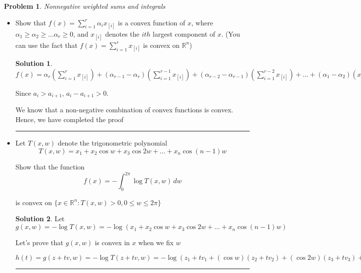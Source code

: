 \documentclass{article}
\theoremstyle{definition}
\newtheorem{problem}{Problem}
\def\fline{\rule{0.75\linewidth}{0.5pt}}
\newcommand{\finishline}{\begin{center}\fline\end{center}}
\newtheorem*{solution*}{Solution}
\newenvironment{solution}{\begin{solution*}}{{\finishline} \end{solution*}}
\begin{document}
\begin{problem}
    \textit{ Nonnegative weighted sums and integrals}
    \begin{itemize}
        \item[(a)] Show that $f(x) = \sum_{i=1}^{r} \alpha_i x_{[i]}$ is a convex function of $x$, where $\alpha_1 \geq \alpha_2 \geq \dots \alpha_r \geq 0$, and $x_{[i]}$  denotes the $ith$ largest component of $x$. (You can use the fact that $f(x) = \sum_{i=1}^{r}  x_{[i]}$ is convex on $\mathbb{R}^n$)

        \begin{solution}
            $f(x) = \alpha_r (\sum_{i=1}^{r}  x_{[i]}) + (\alpha_{r - 1} - \alpha_r) (\sum_{i=1}^{r - 1}  x_{[i]}) + (\alpha_{r - 2} - \alpha_{r - 1}) (\sum_{i=1}^{r - 2}  x_{[i]}) + \dots + (\alpha_{1} - \alpha_{2}) (x_{[1]})$ 

            Since $a_{i} > a_{i + 1}$, $a_{i} - a_{i + 1} > 0$. \newline 

            We know that a non-negative combination of convex functions is convex. Hence, we have completed the proof
        \end{solution}

        \item[(b)] Let $T(x, w)$  denote the trigonometric polynomial
        \begin{equation}
            T(x, w) = x_1 + x_2 \cos{w} + x_3 \cos{2w} + \dots + x_n \cos{(n - 1)w}
         \end{equation}

         
Show that the function 
\begin{equation}
    f(x) = - \int_{0}^{2\pi} \log T(x, w) \,dw
\end{equation}

is convex on $\{x \in \mathbb{R}^n : T(x, w) > 0, 0 \leq w \leq 2\pi\}$

\begin{solution}
    Let $g(x, w) = - \log T(x, w) = - \log(x_1 + x_2 \cos{w} + x_3 \cos{2w} + \dots + x_n \cos{(n - 1)w})$ \newline 

    Let's prove that $g(x, w)$ is convex in $x$ when we fix $w$ \newline 

    $h(t) = g(z + tv, w) = - \log T(z + tv, w) = - \log(z_1 + tv_1 + (\cos{w})(z_2 + tv_2) +  (\cos{2w}) (z_3 + tv_3) + \dots + (\cos{(n - 1)w}) (z_n + tv_n))$ \newline 


\end{solution}
\end{itemize}
\end{problem}
\end{document}
